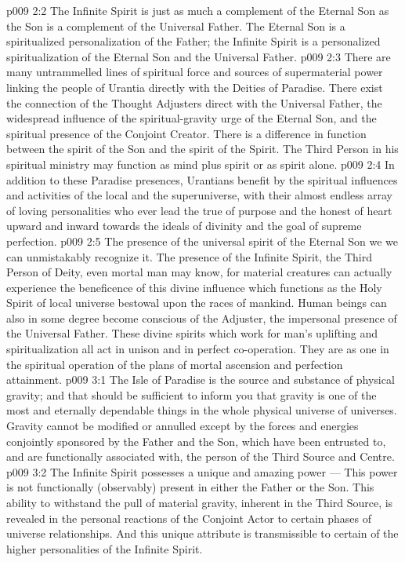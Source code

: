 \vs p009 2:2 The Infinite Spirit is just as much a complement of the Eternal Son as the Son is a complement of the Universal Father. The Eternal Son is a spiritualized personalization of the Father; the Infinite Spirit is a personalized spiritualization of the Eternal Son and the Universal Father.
\vs p009 2:3 There are many untrammelled lines of spiritual force and sources of supermaterial power linking the people of Urantia directly with the Deities of Paradise. There exist the connection of the Thought Adjusters direct with the Universal Father, the widespread influence of the spiritual\hyp{}gravity urge of the Eternal Son, and the spiritual presence of the Conjoint Creator. There is a difference in function between the spirit of the Son and the spirit of the Spirit. The Third Person in his spiritual ministry may function as mind plus spirit or as spirit alone.
\vs p009 2:4 In addition to these Paradise presences, Urantians benefit by the spiritual influences and activities of the local and the superuniverse, with their almost endless array of loving personalities who ever lead the true of purpose and the honest of heart upward and inward towards the ideals of divinity and the goal of supreme perfection.
\vs p009 2:5 The presence of the universal spirit of the Eternal Son we  we can unmistakably recognize it. The presence of the Infinite Spirit, the Third Person of Deity, even mortal man may know, for material creatures can actually experience the beneficence of this divine influence which functions as the Holy Spirit of local universe bestowal upon the races of mankind. Human beings can also in some degree become conscious of the Adjuster, the impersonal presence of the Universal Father. These divine spirits which work for man’s uplifting and spiritualization all act in unison and in perfect co\hyp{}operation. They are as one in the spiritual operation of the plans of mortal ascension and perfection attainment.
\vs p009 3:1 The Isle of Paradise is the source and substance of physical gravity; and that should be sufficient to inform you that gravity is one of the most  and eternally dependable things in the whole physical universe of universes. Gravity cannot be modified or annulled except by the forces and energies conjointly sponsored by the Father and the Son, which have been entrusted to, and are functionally associated with, the person of the Third Source and Centre.
\vs p009 3:2 \pc The Infinite Spirit possesses a unique and amazing power ---  This power is not functionally (observably) present in either the Father or the Son. This ability to withstand the pull of material gravity, inherent in the Third Source, is revealed in the personal reactions of the Conjoint Actor to certain phases of universe relationships. And this unique attribute is transmissible to certain of the higher personalities of the Infinite Spirit.
